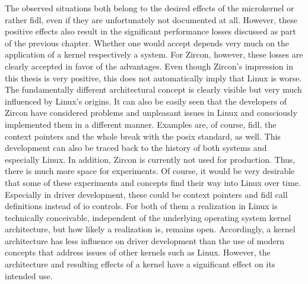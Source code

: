 The observed situations both belong to the desired effects of the microkernel or rather \ac{fidl}, even if they are unfortunately not documented at all.
However, these positive effects also result in the significant performance losses discussed as part of the previous chapter.
Whether one would accept depends very much on the application of a kernel respectively a system.
For Zircon, however, these losses are clearly accepted in favor of the advantages.
Even though Zircon's impression in this thesis is very positive, this does not automatically imply that Linux is worse.
The fundamentally different architectural concept is clearly visible but very much influenced by Linux's origins.
It can also be easily seen that the developers of Zircon have considered problems and unpleasant issues in Linux and consciously implemented them in a different manner.
Examples are, of course, \ac{fidl}, the context pointers and the whole break with the \ac{posix} standard, as well.
This development can also be traced back to the history of both systems and especially Linux.
In addition, Zircon is currently not used for production.
Thus, there is much more space for experiments.
Of course, it would be very desirable that some of these experiments and concepts find their way into Linux over time.
Especially in driver development, these could be context pointers and \ac{fidl} call definitions instead of \ac{io} controls.
For both of them a realization in Linux is technically conceivable, independent of the underlying operating system kernel architecture, but how likely a realization is, remains open.
Accordingly, a kernel architecture has less influence on driver development than the use of modern concepts that address issues of other kernels such as Linux.
However, the architecture and resulting effects of a kernel have a significant effect on its intended use.





